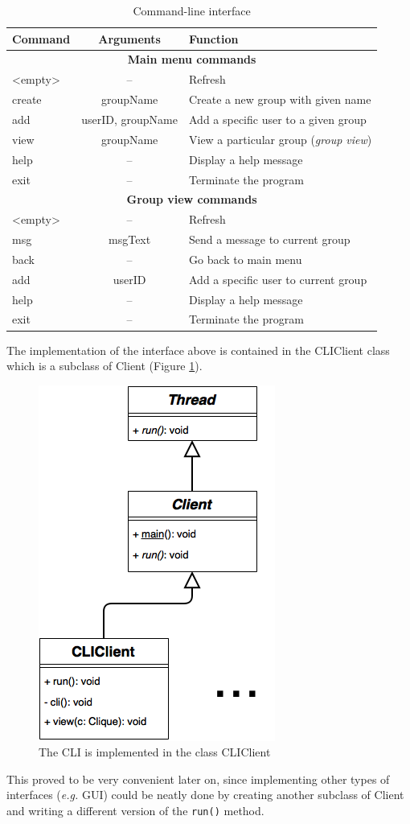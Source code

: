 \documentclass[a4paper, twoside, 12pt]{report}
\begin{document}
\begin{table}[H]
\centering
\begin{tabular*}{0.9\textwidth}{l | c | l}
    Command & Arguments & Function \\
    \hline
    \multicolumn{3}{c}{\textbf{Main menu commands}} \\
    \hline
    <empty> & -- & Refresh \\
    create & groupName & Create a new group with given name \\
    add & userID, groupName & Add a specific user to a given group \\
    view & groupName & View a particular group (\emph{group view}) \\
    help & -- & Display a help message \\
    exit & -- & Terminate the program \\
    \hline
    \multicolumn{3}{c}{\textbf{Group view commands}} \\
    \hline 
    <empty> & -- & Refresh \\
    msg & msgText & Send a message to current group \\
    back & -- & Go back to main menu \\
    add & userID & Add a specific user to current group \\
    help & -- & Display a help message \\
    exit & -- & Terminate the program \\ 
\end{tabular*}
\caption{\label{tab:CLI} Command-line interface}
\end{table}
The implementation of the interface above is contained in the CLIClient class which is a subclass of Client (Figure \ref{fig:CLIClient_uml}).
\begin{figure}[H]
\centering
\includegraphics[width = 0.31 \linewidth]{pics/CLIClient_uml.png}
\caption{\label{fig:CLIClient_uml} The CLI is implemented in the class CLIClient}
\end{figure}
This proved to be very convenient later on, since implementing other types of interfaces (\textit{e.g.} GUI) could be neatly done by creating another subclass of Client and writing a different version of the \texttt{run()} method. \\
\end{document}
